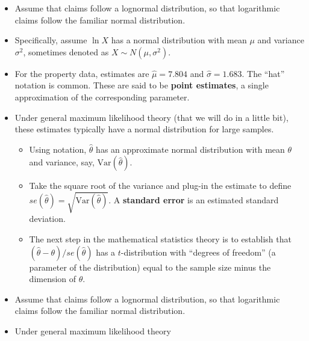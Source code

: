 \documentclass[]{book}
\theoremstyle{definition}
\theoremstyle{definition}
\theoremstyle{definition}
\theoremstyle{remark}
\begin{document}
\begin{itemize}
\item
  Assume that claims follow a lognormal distribution, so that
  logarithmic claims follow the familiar normal distribution.
\item
  Specifically, assume \(\ln X\) has a normal distribution with mean
  \(\mu\) and variance \(\sigma^2\), sometimes denoted as
  \(X \sim N(\mu, \sigma^2)\).
\item
  For the property data, estimates are \(\hat{\mu} =7.804\) and
  \(\hat{\sigma} = 1.683\). The ``hat'' notation is common. These are
  said to be \textbf{point estimates}, a single approximation of the
  corresponding parameter.
\item
  Under general maximum likelihood theory (that we will do in a little
  bit), these estimates typically have a normal distribution for large
  samples.

  \begin{itemize}
  \item
    Using notation, \(\hat{\theta}\) has an approximate normal
    distribution with mean \(\theta\) and variance, say,
    \(\mathrm{Var}(\hat{\theta})\).
  \item
    Take the square root of the variance and plug-in the estimate to
    define \(se(\hat{\theta}) = \sqrt{\mathrm{Var}(\hat{\theta})}\). A
    \textbf{standard error} is an estimated standard deviation.
  \item
    The next step in the mathematical statistics theory is to establish
    that \((\hat{\theta}-\theta)/se(\hat{\theta})\) has a
    \(t\)-distribution with ``degrees of freedom'' (a parameter of the
    distribution) equal to the sample size minus the dimension of
    \(\theta\).
  \end{itemize}
\item
  Assume that claims follow a lognormal distribution, so that
  logarithmic claims follow the familiar normal distribution.
\item
  Under general maximum likelihood theory


\end{itemize}
\end{document}
